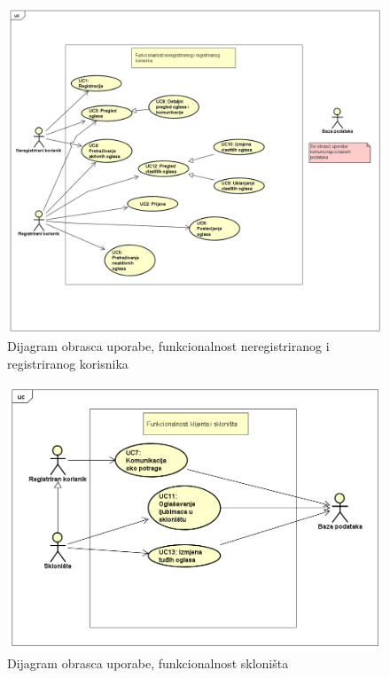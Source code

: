 					\begin{figure}[H]
						\includegraphics[scale=0.45]{dijagrami/dijagrami obrazaca uporabe/uc dijagram 1} %
						\centering
						\caption{Dijagram obrasca uporabe, funkcionalnost neregistriranog i registriranog korisnika}
						\label{fig:ucDijagram1}
					\end{figure}
					
					\begin{figure}[H]
						\includegraphics[scale=0.63]{dijagrami/dijagrami obrazaca uporabe/uc dijagram 2} %
						\centering
						\caption{Dijagram obrasca uporabe, funkcionalnost skloništa}
						\label{fig:ucDijagram2}
					\end{figure}
					
